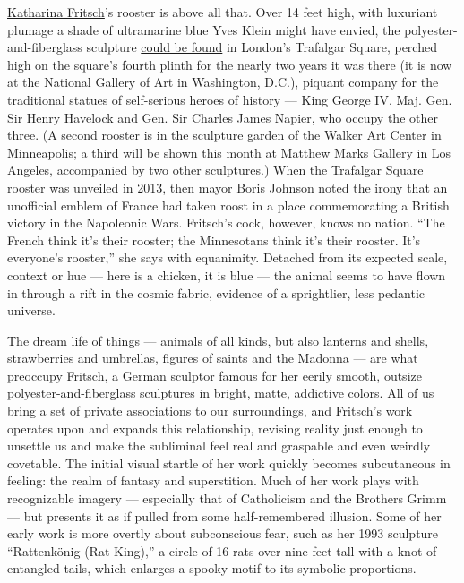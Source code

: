 \href{https://www.matthewmarks.com/new-york/artists/katharina-fritsch/}{Katharina
Fritsch}'s rooster is above all that. Over 14 feet high, with luxuriant
plumage a shade of ultramarine blue Yves Klein might have envied, the
polyester-and-fiberglass sculpture
\href{https://artsbeat.blogs.nytimes3xbfgragh.onion/2014/02/07/coming-to-trafalgar-square-an-unusual-horse-and-a-giant-thumb/}{could
be found} in London's Trafalgar Square, perched high on the square's
fourth plinth for the nearly two years it was there (it is now at the
National Gallery of Art in Washington, D.C.), piquant company for the
traditional statues of self-serious heroes of history --- King George
IV, Maj. Gen. Sir Henry Havelock and Gen. Sir Charles James Napier, who
occupy the other three. (A second rooster is
\href{https://www.nytimes3xbfgragh.onion/2016/01/22/arts/design/the-new-cherries-on-top-of-the-minneapolis-sculpture-garden.html}{in
the sculpture garden of the Walker Art Center} in Minneapolis; a third
will be shown this month at Matthew Marks Gallery in Los Angeles,
accompanied by two other sculptures.) When the Trafalgar Square rooster
was unveiled in 2013, then mayor Boris Johnson noted the irony that an
unofficial emblem of France had taken roost in a place commemorating a
British victory in the Napoleonic Wars. Fritsch's cock, however, knows
no nation. ``The French think it's their rooster; the Minnesotans think
it's their rooster. It's everyone's rooster,'' she says with equanimity.
Detached from its expected scale, context or hue --- here is a chicken,
it is blue --- the animal seems to have flown in through a rift in the
cosmic fabric, evidence of a sprightlier, less pedantic universe.

The dream life of things --- animals of all kinds, but also lanterns and
shells, strawberries and umbrellas, figures of saints and the Madonna
--- are what preoccupy Fritsch, a German sculptor famous for her eerily
smooth, outsize polyester-and-fiberglass sculptures in bright, matte,
addictive colors. All of us bring a set of private associations to our
surroundings, and Fritsch's work operates upon and expands this
relationship, revising reality just enough to unsettle us and make the
subliminal feel real and graspable and even weirdly covetable. The
initial visual startle of her work quickly becomes subcutaneous in
feeling: the realm of fantasy and superstition. Much of her work plays
with recognizable imagery --- especially that of Catholicism and the
Brothers Grimm --- but presents it as if pulled from some
half-remembered illusion. Some of her early work is more overtly about
subconscious fear, such as her 1993 sculpture ``Rattenkönig
(Rat‑King),'' a circle of 16 rats over nine feet tall with a knot of
entangled tails, which enlarges a spooky motif to its symbolic
proportions.

